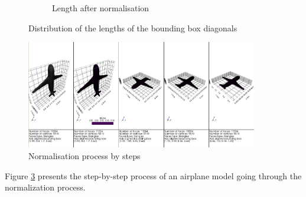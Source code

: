 \begin{figure}[ht]
\begin{subfigure}[b]{0.45\textwidth}
        \caption{Length after normalisation}
        \label{fig:resampling-diagonal-after}
    \end{subfigure}
    \caption{Distribution of the lengths of the bounding box diagonals}
    \label{fig:resampling-diagonal}
\end{figure}

\begin{figure}[ht]
    \centering
    \includegraphics[width = 0.9\textwidth]{assets/visualisation/normalization_process.png}
    \caption{Normalisation process by steps}
    \label{fig:normalization-by-steps}
\end{figure}

Figure \ref{fig:normalization-by-steps} presents the step-by-step process of an airplane model going through
the normalization process.